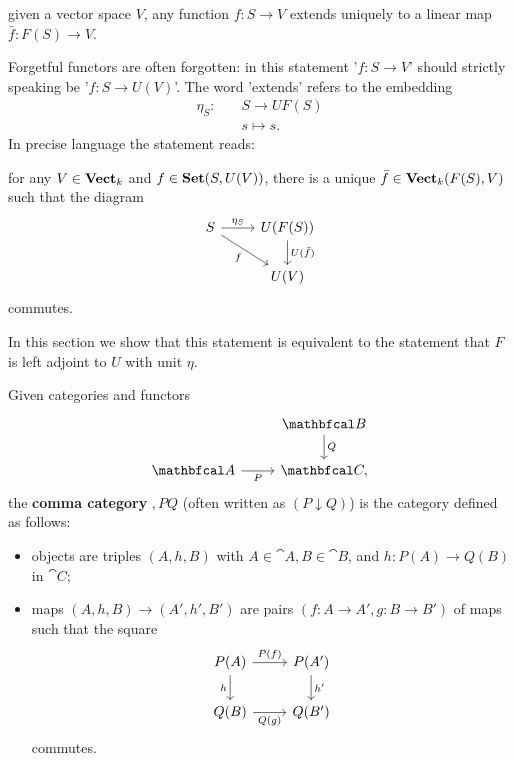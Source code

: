 \bigskip\noindent given a vector space $V$, any function $f:S\to V$ extends uniquely to a linear map $\bar{f}:F(S)\to V$.\par

\bigskip Forgetful functors are often forgotten: in this statement '$f:S\to V$' should strictly speaking be '$f:S\to U(V)$'. The word 'extends' refers to the embedding
\begin{align*}
    \eta_S:\quad & S\to UF(S)\\
            & s\mapsto s.
\end{align*}
In precise language the statement reads:\par\bigskip

    for any $V\in\mathbf{Vect}_k$ and $f\in\mathbf{Set}(S,U(V))$, there is a unique $\bar{f}\in\mathbf{Vect}_k(F(S),V)$ such that the diagram
    \begin{equation}\label{eq:third_adj_def}
    \begin{tikzcd}
        S \arrow[r, "\eta_S"] \arrow[dr, "f"'] & U(F(S)) \arrow[d, "U(\bar{f})"] \\
                                              & U(V)
    \end{tikzcd}
    \end{equation}
    commutes.\par\bigskip

In this section we show that this statement is equivalent to the statement that $F$ is left adjoint to $U$ with unit $\eta$.

\begin{definition}
    Given categories and functors
    \begin{equation*}
    \begin{tikzcd}
        & \cat{B} \arrow[d, "Q"]\\
        \cat{A} \arrow[r, "P"'] & \cat{C},
    \end{tikzcd}
    \end{equation*}
    the \textbf{comma category} $\comma{P}{Q}$ (often written as $(P\downarrow Q)$) is the category defined as follows:
    \begin{itemize}
        \item objects are triples $(A,h,B)$ with $A\in\cat{A}, B\in\cat{B}$, and $h: P(A)\to Q(B)$ in $\cat{C}$;
        \item maps $(A,h,B)\to (A',h',B')$ are pairs $(f:A\to A', g:B\to B')$ of maps such that the square
            \begin{equation*}
            \begin{tikzcd}
                P(A) \arrow[r, "P(f)"] \arrow[d, "h"'] & P(A') \arrow[d, "h'"] \\
                Q(B) \arrow[r, "Q(g)"'] & Q(B')
            \end{tikzcd}
            \end{equation*}
            commutes.
    \end{itemize}
\end{definition}

